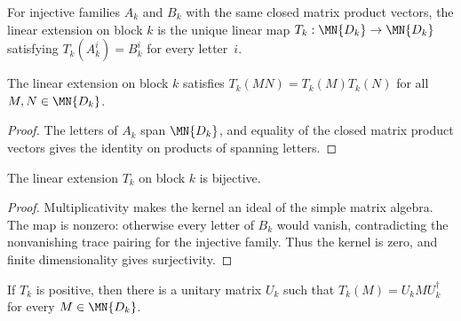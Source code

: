 \begin{definition}%
    \label{def:mpdo_virtual_perBlockLinearExtension}
    \leanok
    For injective families $A_k$ and $B_k$ with the same closed matrix
    product vectors, the linear extension on block $k$ is the unique linear map
    $T_k:\MN{D_k}\to\MN{D_k}$ satisfying $T_k(A_k^i)=B_k^i$ for every
    letter~$i$.
\end{definition}

\begin{lemma}%
    \label{thm:mpdo_virtual_perBlockLinearExtension_mul}
    \leanok
    The linear extension on block $k$ satisfies $T_k(MN)=T_k(M)T_k(N)$ for all
    $M,N\in\MN{D_k}$.
\end{lemma}

\begin{proof}\leanok
    The letters of $A_k$ span $\MN{D_k}$, and equality of the closed matrix
    product vectors gives the identity on products of spanning letters.
\end{proof}

\begin{lemma}%
    \label{thm:mpdo_virtual_perBlockLinearExtension_bijective}
    \leanok
    The linear extension $T_k$ on block $k$ is bijective.
\end{lemma}

\begin{proof}\leanok
    Multiplicativity makes the kernel an ideal of the simple matrix algebra.
    The map is nonzero: otherwise every letter of $B_k$ would vanish,
    contradicting the nonvanishing trace pairing for the injective family.
    Thus the kernel is zero, and finite dimensionality gives surjectivity.
\end{proof}

\begin{lemma}%
    \label{thm:mpdo_positive_perBlockLinearExtension_unitary}
    \leanok
    If $T_k$ is positive, then there is a unitary matrix $U_k$ such that
    $T_k(M)=U_kMU_k^\dagger$ for every $M\in\MN{D_k}$.
\end{lemma}

